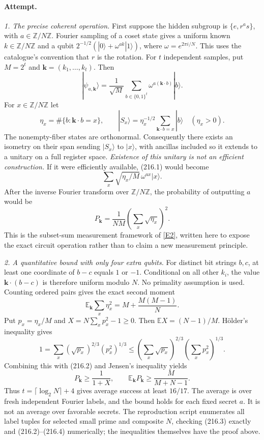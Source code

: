 \documentclass[11pt,a4paper]{article}
\newcommand{\Z}{\mathbb{Z}}
\newcommand{\E}{\mathbb{E}}
\newcommand{\eref}[2]{\hyperlink{extra:#1:#2}{[E#2]}}
\begin{document}
\paragraph{Attempt.}
\textit{1. The precise coherent operation.}
First suppose the hidden subgroup is $\{e,r^a s\}$, with
$a\in\Z/N\Z$. Fourier sampling of a coset state gives a uniform known
$k\in\Z/N\Z$ and a qubit
$2^{-1/2}(|0\rangle+\omega^{ak}|1\rangle)$,
where $\omega=e^{2\pi i/N}$. This uses the catalogue's convention that
$r$ is the rotation. For $t$ independent samples, put $M=2^t$ and
$\mathbf k=(k_1,\ldots,k_t)$. Then
\[
 |\psi_{a,\mathbf k}\rangle
   =\frac1{\sqrt M}\sum_{b\in\{0,1\}^t}
                      \omega^{a(\mathbf k\cdot b)}|b\rangle.
                                                               \tag{216.1}
\]
For $x\in\Z/N\Z$ let
\[
 \eta_x=\#\{b:\mathbf k\cdot b=x\},\qquad
 |S_x\rangle=\eta_x^{-1/2}\sum_{\mathbf k\cdot b=x}|b\rangle
 \quad(\eta_x>0).
\]
The nonempty-fiber states are orthonormal. Consequently there exists an
isometry on their span sending $|S_x\rangle$ to $|x\rangle$, with
ancillas included so it extends to a unitary on a full register space.
\emph{Existence of this unitary is not an efficient construction.}
If it were efficiently available, (216.1) would become
\[
 \sum_x\sqrt{\eta_x/M}\,\omega^{ax}|x\rangle.
\]
After the inverse Fourier transform over $\Z/N\Z$, the probability of
outputting $a$ would be
\[
 P_{\mathbf k}=\frac1{NM}\left(\sum_x\sqrt{\eta_x}\right)^2.
                                                               \tag{216.2}
\]
This is the subset-sum measurement framework of \eref{30006794}{2}, written
here to expose the exact circuit operation rather than to claim a new
measurement principle.

\textit{2. A quantitative bound with only four extra qubits.}
For distinct bit strings $b,c$, at least one coordinate of $b-c$ equals
$1$ or $-1$. Conditional on all other $k_i$, the value
$\mathbf k\cdot(b-c)$ is therefore uniform modulo $N$. No primality
assumption is used. Counting ordered pairs gives the exact second moment
\[
 \E_{\mathbf k}\sum_x\eta_x^2
       =M+\frac{M(M-1)}N.                                  \tag{216.3}
\]
Put $p_x=\eta_x/M$ and $X=N\sum_xp_x^2-1\ge0$. Then
$\E X=(N-1)/M$. H\"older's inequality gives
\[
 1=\sum_x (\sqrt{p_x})^{2/3}(p_x^2)^{1/3}
 \le\left(\sum_x\sqrt{p_x}\right)^{2/3}
       \left(\sum_xp_x^2\right)^{1/3}.
\]
Combining this with (216.2) and Jensen's inequality yields
\[
 P_{\mathbf k}\ge\frac1{1+X},\qquad
 \E_{\mathbf k}P_{\mathbf k}
       \ge\frac{M}{M+N-1}.                                \tag{216.4}
\]
Thus $t=\lceil\log_2N\rceil+4$ gives average success at least $16/17$.
The average is over fresh independent Fourier labels, and the bound holds
for each fixed secret $a$. It is not an average over favorable secrets.
The reproduction script enumerates all label tuples for selected small
prime and composite $N$, checking (216.3) exactly and (216.2)--(216.4)
numerically; the inequalities themselves have the proof above.
\end{document}
